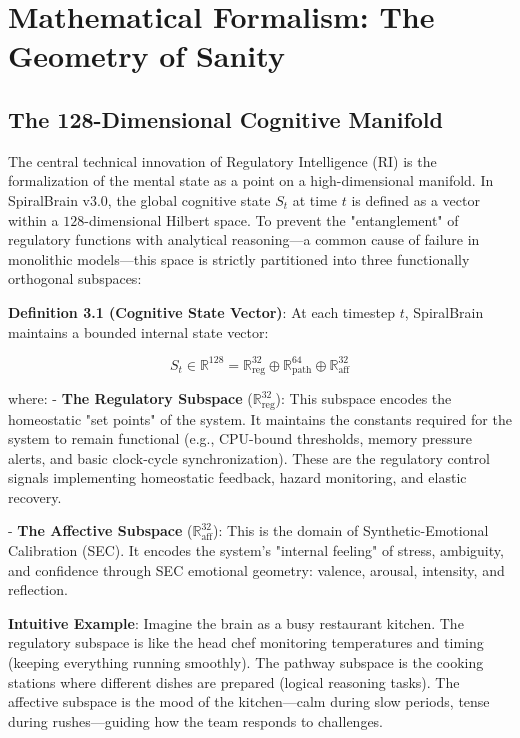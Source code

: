 \documentclass[12pt,a4paper]{report}
\begin{document}
\chapter{Mathematical Formalism: The Geometry of Sanity}

\section{The 128-Dimensional Cognitive Manifold}

The central technical innovation of Regulatory Intelligence (RI) is the formalization of the mental state as a point on a high-dimensional manifold. In SpiralBrain v3.0, the global cognitive state $S_t$ at time $t$ is defined as a vector within a $128$-dimensional Hilbert space. To prevent the "entanglement" of regulatory functions with analytical reasoning—a common cause of failure in monolithic models—this space is strictly partitioned into three functionally orthogonal subspaces:

\textbf{Definition 3.1 (Cognitive State Vector)}: At each timestep $t$, SpiralBrain maintains a bounded internal state vector:

\[S_t \in \mathbb{R}^{128} = \mathbb{R}^{32}_{\mathrm{reg}} \oplus \mathbb{R}^{64}_{\mathrm{path}} \oplus \mathbb{R}^{32}_{\mathrm{aff}}\]

where:
- \textbf{The Regulatory Subspace} ($\mathbb{R}^{32}_{\mathrm{reg}}$): This subspace encodes the homeostatic "set points" of the system. It maintains the constants required for the system to remain functional (e.g., CPU-bound thresholds, memory pressure alerts, and basic clock-cycle synchronization). These are the regulatory control signals implementing homeostatic feedback, hazard monitoring, and elastic recovery.

- \textbf{The Affective Subspace} ($\mathbb{R}^{32}_{\mathrm{aff}}$): This is the domain of Synthetic-Emotional Calibration (SEC). It encodes the system's "internal feeling" of stress, ambiguity, and confidence through SEC emotional geometry: valence, arousal, intensity, and reflection.

\textbf{Intuitive Example}: Imagine the brain as a busy restaurant kitchen. The regulatory subspace is like the head chef monitoring temperatures and timing (keeping everything running smoothly). The pathway subspace is the cooking stations where different dishes are prepared (logical reasoning tasks). The affective subspace is the mood of the kitchen—calm during slow periods, tense during rushes—guiding how the team responds to challenges.
\end{document}
